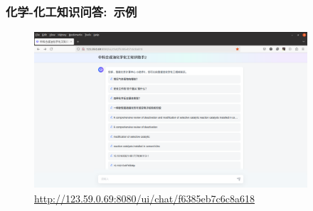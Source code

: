\begin{frame}
	\frametitle{化学-化工知识问答:~示例}	
\begin{figure}[h!]
\centering
\includegraphics[height=2.30in,width=4.00in,viewport=0 0 1528 875,clip]{Figures/MaxKB_Chem.png}
\caption{\tiny\textrm{\url{http://123.59.0.69:8080/ui/chat/f6385eb7c6c8a618}}}%
\label{Fig:MaxKB_Chem}
\end{figure}
\end{frame}

